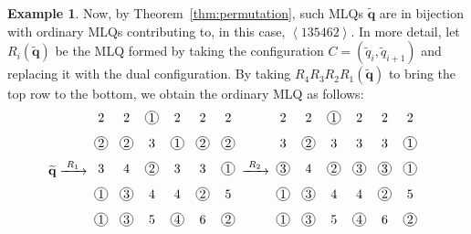 \documentclass[reqno]{amsart}
\newcommand{\0}{\phantom{c}}
\newcommand{\swt}[1]{\left\langle #1 \right\rangle} %
\newcommand{\qq}{\mathbf{q}}
\theoremstyle{plain}
\theoremstyle{definition}
\newtheorem{example}[thm]{Example}
\numberwithin{equation}{section}
\begin{document}
\begin{example}
Now, by Theorem~\ref{thm:permutation}, such MLQs $\widetilde{\qq}$ are in bijection with ordinary MLQs contributing to, in this case, $\swt{135462}$.
In more detail, let $R_i(\widetilde{\qq})$ be the MLQ formed by taking the configuration $C = (\widetilde{q}_i, \widetilde{q}_{i+1})$ and replacing it with the dual configuration.
By taking $R_4 R_3 R_2 R_1(\widetilde{\qq})$ to bring the top row to the bottom, we obtain the ordinary MLQ as follows:
\begin{align*}
\; \widetilde{\qq} & \xrightarrow[\hspace{15pt}]{R_1} \;
\begin{tikzpicture}[xscale=0.7,yscale=0.7,every node/.style={inner sep=0.8pt},baseline=55]
\node at (0, 5){2};\node at (1, 5){2};\node[circle, draw=black] at (2, 5){1};\node at (3, 5){2};\node at (4, 5){2};\node at (5, 5){2};\node[circle, draw=black] at (0, 4){2};\node[circle, draw=black] at (1, 4){2};\node at (2, 4){3};\node[circle, draw=black] at (3, 4){1};\node[circle, draw=black] at (4, 4){2};\node[circle, draw=black] at (5, 4){2};\node at (0, 3){3};\node at (1, 3){4};\node[circle, draw=black] at (2, 3){2};\node at (3, 3){3};\node at (4, 3){3};\node[circle, draw=black] at (5, 3){1};\node[circle, draw=black] at (0, 2){1};\node[circle, draw=black] at (1, 2){3};\node at (2, 2){4};\node at (3, 2){4};\node[circle, draw=black] at (4, 2){2};\node at (5, 2){5};\node[circle, draw=black] at (0, 1){1};\node[circle, draw=black] at (1, 1){3};\node at (2, 1){5};\node[circle, draw=black] at (3, 1){4};\node at (4, 1){6};\node[circle, draw=black] at (5, 1){2};
\end{tikzpicture}
\; \xrightarrow[\hspace{15pt}]{R_2} \;
\begin{tikzpicture}[xscale=0.7,yscale=0.7,every node/.style={inner sep=0.8pt},baseline=55]
\node at (0, 5){2};\node at (1, 5){2};\node[circle, draw=black] at (2, 5){1};\node at (3, 5){2};\node at (4, 5){2};\node at (5, 5){2};\node at (0, 4){3};\node[circle, draw=black] at (1, 4){2};\node at (2, 4){3};\node at (3, 4){3};\node at (4, 4){3};\node[circle, draw=black] at (5, 4){1};\node[circle, draw=black] at (0, 3){3};\node at (1, 3){4};\node[circle, draw=black] at (2, 3){2};\node[circle, draw=black] at (3, 3){3};\node[circle, draw=black] at (4, 3){3};\node[circle, draw=black] at (5, 3){1};\node[circle, draw=black] at (0, 2){1};\node[circle, draw=black] at (1, 2){3};\node at (2, 2){4};\node at (3, 2){4};\node[circle, draw=black] at (4, 2){2};\node at (5, 2){5};\node[circle, draw=black] at (0, 1){1};\node[circle, draw=black] at (1, 1){3};\node at (2, 1){5};\node[circle, draw=black] at (3, 1){4};\node at (4, 1){6};\node[circle, draw=black] at (5, 1){2};

\end{tikzpicture}
\end{align*}
\end{example}
\end{document}
